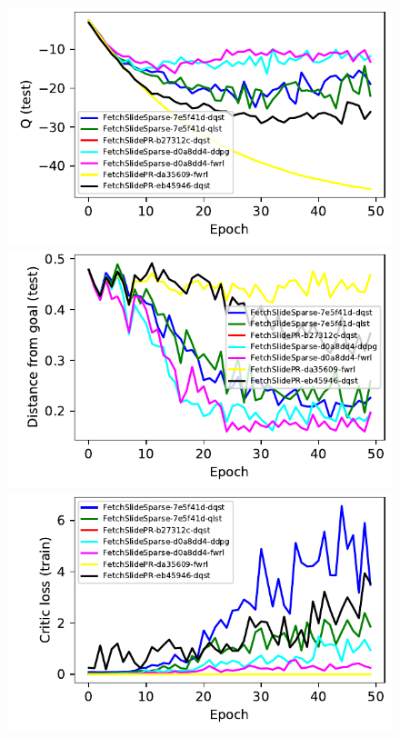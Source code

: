 \begin{figure}
  \includegraphics[width=\frac\columnwidth]{./media/res/eb45946-path_reward-FetchSlidePR-v1-dqst/test/mean_Q.pdf}%
  \includegraphics[width=\frac\columnwidth]{./media/res/eb45946-path_reward-FetchSlidePR-v1-dqst/test/ag_g_dist.pdf}%
  \includegraphics[width=\frac\columnwidth]{./media/res/eb45946-path_reward-FetchSlidePR-v1-dqst/train/critic_loss.pdf}\\

\end{figure}
